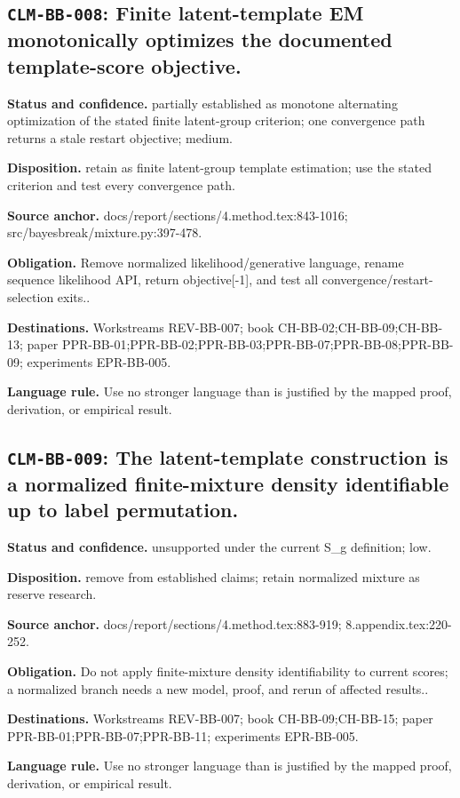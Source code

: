 \subsection[\texttt{CLM-BB-008}]{\texttt{CLM-BB-008}: Finite latent-template EM monotonically optimizes the documented template-score objective.}
\textbf{Status and confidence.} partially established as monotone alternating optimization of the stated finite latent-group criterion; one convergence path returns a stale restart objective; medium.\par
\textbf{Disposition.} retain as finite latent-group template estimation; use the stated criterion and test every convergence path.\par
\textbf{Source anchor.} docs/report/sections/4.method.tex:843-1016; src/bayesbreak/mixture.py:397-478.\par
\textbf{Obligation.} Remove normalized likelihood/generative language, rename sequence likelihood API, return objective[-1], and test all convergence/restart-selection exits..\par
\textbf{Destinations.} Workstreams REV-BB-007; book CH-BB-02;CH-BB-09;CH-BB-13; paper PPR-BB-01;PPR-BB-02;PPR-BB-03;PPR-BB-07;PPR-BB-08;PPR-BB-09; experiments EPR-BB-005.\par
\textbf{Language rule.} Use no stronger language than is justified by the mapped proof, derivation, or empirical result.

\subsection[\texttt{CLM-BB-009}]{\texttt{CLM-BB-009}: The latent-template construction is a normalized finite-mixture density identifiable up to label permutation.}
\textbf{Status and confidence.} unsupported under the current S\_g definition; low.\par
\textbf{Disposition.} remove from established claims; retain normalized mixture as reserve research.\par
\textbf{Source anchor.} docs/report/sections/4.method.tex:883-919; 8.appendix.tex:220-252.\par
\textbf{Obligation.} Do not apply finite-mixture density identifiability to current scores; a normalized branch needs a new model, proof, and rerun of affected results..\par
\textbf{Destinations.} Workstreams REV-BB-007; book CH-BB-09;CH-BB-15; paper PPR-BB-01;PPR-BB-07;PPR-BB-11; experiments EPR-BB-005.\par
\textbf{Language rule.} Use no stronger language than is justified by the mapped proof, derivation, or empirical result.

